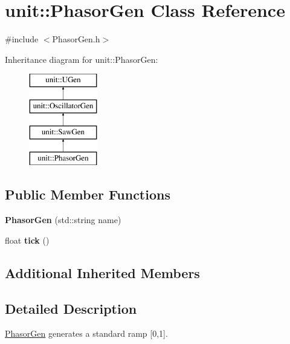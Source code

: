 \hypertarget{classunit_1_1PhasorGen}{}\section{unit\+:\+:Phasor\+Gen Class Reference}
\label{classunit_1_1PhasorGen}


{\ttfamily \#include $<$Phasor\+Gen.\+h$>$}

Inheritance diagram for unit\+:\+:Phasor\+Gen\+:\begin{figure}[H]
\begin{center}
\leavevmode
\includegraphics[height=4.000000cm]{classunit_1_1PhasorGen}
\end{center}
\end{figure}
\subsection*{Public Member Functions}
\begin{DoxyCompactItemize}
\item 
{\bfseries Phasor\+Gen} (std\+::string name)\hypertarget{classunit_1_1PhasorGen_a726fab6730e45d7fbf242f4613837e28}{}\label{classunit_1_1PhasorGen_a726fab6730e45d7fbf242f4613837e28}

\item 
float {\bfseries tick} ()\hypertarget{classunit_1_1PhasorGen_a056953090628af9868e4778d15daf79a}{}\label{classunit_1_1PhasorGen_a056953090628af9868e4778d15daf79a}

\end{DoxyCompactItemize}
\subsection*{Additional Inherited Members}


\subsection{Detailed Description}
\hyperlink{classunit_1_1PhasorGen}{Phasor\+Gen} generates a standard ramp \mbox{[}0,1\mbox{]}.

